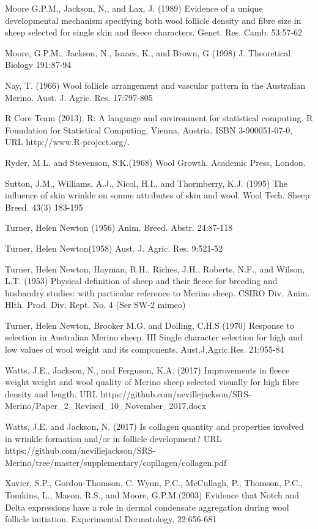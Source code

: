 \documentclass[titlepage]{article}  %
\begin{document}
\begin{thebibliography}{99}
Moore G.P.M., Jackson, N., and Lax, J. (1989) Evidence of a unique developmental mechanism specifying both wool follicle density and fibre size in sheep selected for single skin and fleece characters. Genet. Res. Camb. 53:57-62

Moore, G.P.M., Jackson, N., Isaacs, K., and Brown, G (1998) J. Theoretical Biology 191:87-94

Nay, T. (1966) Wool follicle arrangement and vascular pattern in the Australian Merino. Aust. J. Agric. Res. 17:797-805

R Core Team (2013). R: A language and environment for statistical
  computing. R Foundation for Statistical Computing, Vienna, Austria.
  ISBN 3-900051-07-0, URL http://www.R-project.org/.

Ryder, M.L. and Stevenson, S.K.(1968) Wool Growth. Academic Press, London.

Sutton, J.M., Williams, A.J., Nicol, H.I., and Thormberry, K.J. (1995) The influence of skin wrinkle on sonme attributes of skin and wool. Wool Tech. Sheep Breed. 43(3) 183-195

Turner, Helen Newton (1956) Anim. Breed. Abstr. 24:87-118

Turner, Helen Newton(1958) Aust. J. Agric. Res. 9:521-52

Turner, Helen Newton, Hayman, R.H., Riches, J.H., Roberts, N.F., and Wilson, L.T. (1953) Physical definition of sheep and their fleece for breeding and husbandry studies: with particular reference to Merino sheep. CSIRO Div. Anim. Hlth. Prod. Div. Rept. No. 4 (Ser SW-2 mimeo)

Turner, Helen Newton, Brooker M.G. and Dolling, C.H.S (1970) Response to selection in Australian Merino sheep. III Single character selection for high and low values of wool weight and its components. Aust.J.Agric.Res. 21:955-84

Watts, J.E., Jackson, N., and Ferguson, K.A. (2017) Improvements in fleece weight weight and wool quality of Merino sheep selected visually for high fibre density and length. URL https://github.com/nevillejackson/SRS-Merino/Paper\_2\_Revised\_10\_November\_2017.docx 

Watts, J.E. and Jackson, N. (2017) Is collagen quantity and properties involved in wrinkle formation and/or in follicle development? URL https://github.com/nevillejackson/SRS-Merino/tree/master/supplementary/copllagen/collagen.pdf

Xavier, S.P., Gordon-Thomson, C. Wynn, P.C., McCullagh, P., Thomson, P.C., Tomkins, L., Mason, R.S., and Moore, G.P.M.(2003) Evidence that Notch and Delta expressions have a role in dermal condensate aggregation during wool follicle initiation. Experimental Dermatology, 22:656-681

\end{thebibliography}
\end{document}
